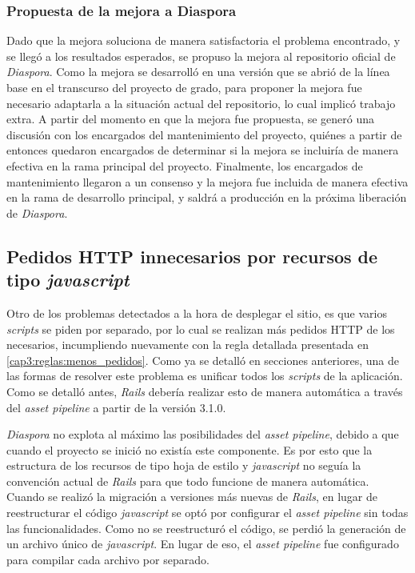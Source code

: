 \subsubsection{Propuesta de la mejora a Diaspora}

Dado que la mejora soluciona de manera satisfactoria el problema encontrado, y se llegó a los resultados esperados, se propuso la mejora al repositorio oficial de 
\emph{Diaspora}.
Como la mejora se desarrolló en una versión que se abrió de la línea base en el transcurso del proyecto de grado, para proponer la mejora fue necesario adaptarla a la situación
actual del repositorio, lo cual implicó trabajo extra. A partir del momento en que la mejora fue propuesta, se generó una discusión con los encargados del mantenimiento del 
proyecto, quiénes a partir de entonces quedaron encargados de determinar si la mejora se incluiría de manera efectiva en la rama principal del proyecto. Finalmente, los
encargados de mantenimiento llegaron a un consenso y la mejora fue incluida de manera efectiva en la rama de desarrollo principal, y saldrá a producción en la próxima
liberación de \emph{Diaspora}.

\subsection{Pedidos HTTP innecesarios por recursos de tipo \emph{javascript}}

Otro de los problemas detectados a la hora de desplegar el sitio, es que varios \emph{scripts} se piden por separado, por lo cual se realizan más pedidos HTTP de los
necesarios, incumpliendo nuevamente con la regla detallada presentada en \ref{cap3:reglas:menos_pedidos}. Como ya se detalló en secciones anteriores, una de las formas de 
resolver este problema es unificar todos los \emph{scripts} de la aplicación. Como se detalló antes, \emph{Rails} debería realizar esto de manera automática a través del \emph{asset 
pipeline} a partir de la versión 3.1.0.

\emph{Diaspora} no explota al máximo las posibilidades del \emph{asset pipeline}, debido
a que cuando el proyecto se inició no existía este componente. Es por 
esto que la estructura de los recursos de tipo hoja de estilo y \emph{javascript} no seguía la convención actual de \emph{Rails} para que todo funcione de manera automática. Cuando 
se realizó la migración a versiones más nuevas de \emph{Rails}, en lugar de reestructurar el código \emph{javascript} se optó por configurar el \emph{asset pipeline} sin todas las 
funcionalidades. Como no se reestructuró el código, se perdió la generación de un archivo único de \emph{javascript}. En lugar de eso, el \emph{asset pipeline} fue configurado para 
compilar cada archivo por separado.

